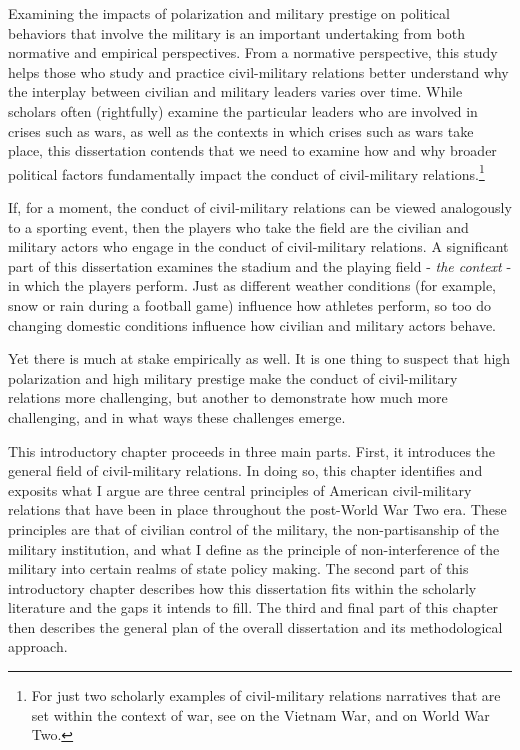 \documentclass[
  12pt,
  oneside]{memoir}
\begin{document}
Examining the impacts of polarization and military prestige on political behaviors that involve the military is an important undertaking from both normative and empirical perspectives. From a normative perspective, this study helps those who study and practice civil-military relations better understand why the interplay between civilian and military leaders varies over time. While scholars often (rightfully) examine the particular leaders who are involved in crises such as wars, as well as the contexts in which crises such as wars take place, this dissertation contends that we need to examine how and why broader political factors fundamentally impact the conduct of civil-military relations.\footnote{For just two scholarly examples of civil-military relations narratives that are set within the context of war, see \textcite{mcmaster_dereliction_1997} on the Vietnam War, and \textcite{kaiser_no_2014} on World War Two.}

If, for a moment, the conduct of civil-military relations can be viewed analogously to a sporting event, then the players who take the field are the civilian and military actors who engage in the conduct of civil-military relations. A significant part of this dissertation examines the stadium and the playing field - \emph{the context} - in which the players perform. Just as different weather conditions (for example, snow or rain during a football game) influence how athletes perform, so too do changing domestic conditions influence how civilian and military actors behave.

Yet there is much at stake empirically as well. It is one thing to suspect that high polarization and high military prestige make the conduct of civil-military relations more challenging, but another to demonstrate how much more challenging, and in what ways these challenges emerge.

This introductory chapter proceeds in three main parts. First, it introduces the general field of civil-military relations. In doing so, this chapter identifies and exposits what I argue are three central principles of American civil-military relations that have been in place throughout the post-World War Two era. These principles are that of civilian control of the military, the non-partisanship of the military institution, and what I define as the principle of non-interference of the military into certain realms of state policy making. The second part of this introductory chapter describes how this dissertation fits within the scholarly literature and the gaps it intends to fill. The third and final part of this chapter then describes the general plan of the overall dissertation and its methodological approach.
\end{document}
